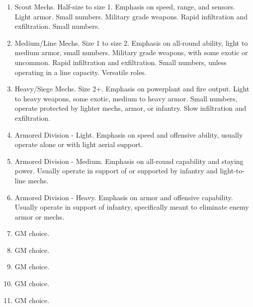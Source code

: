 \begin{enumerate}
    \item Scout Mechs. Half-size to size 1. Emphasis on speed, range, and sensors. Light armor. Small numbers. Military grade weapons. Rapid infiltration and exfiltration. Small numbers.
    \item Medium/Line Mechs. Size 1 to size 2. Emphasis on all-round ability, light to medium armor, small numbers. Military grade weapons, with some exotic or uncommon. Rapid infiltration and exfiltration. Small numbers, unless operating in a line capacity. Versatile roles.
    \item Heavy/Siege Mechs. Size 2+. Emphasis on powerplant and fire output. Light to heavy weapons, some exotic, medium to heavy armor. Small numbers, operate protected by lighter mechs, armor, or infantry. Slow infiltration and exfiltration.
    \item Armored Division - Light. Emphasis on speed and offensive ability, usually operate alone or with light aerial support.
    \item Armored Division - Medium. Emphasis on all-round capability and staying power. Usually operate in support of or supported by infantry and light-to-line mechs.
    \item Armored Division - Heavy. Emphasis on armor and offensive capability. Usually operate in support of infantry, specifically meant to eliminate enemy armor or mechs.
    \item GM choice.
    \item GM choice.
    \item GM choice.
    \item GM choice.
    \item GM choice.
\end{enumerate}

